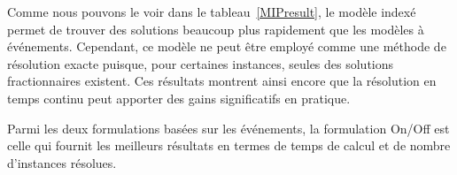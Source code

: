Comme nous pouvons le voir dans le tableau~\ref{MIPresult}, le
modèle indexé permet de trouver des solutions beaucoup plus rapidement
que les modèles à événements. Cependant, ce modèle ne peut être
employé comme une méthode de résolution exacte  puisque, pour
certaines instances, seules des solutions fractionnaires existent.
Ces résultats montrent ainsi encore que la résolution en temps continu
peut apporter des gains significatifs en pratique. 

Parmi les deux formulations basées sur les événements, la formulation
On/Off est celle qui fournit les meilleurs résultats en termes de
temps de calcul et de nombre d'instances résolues. 
